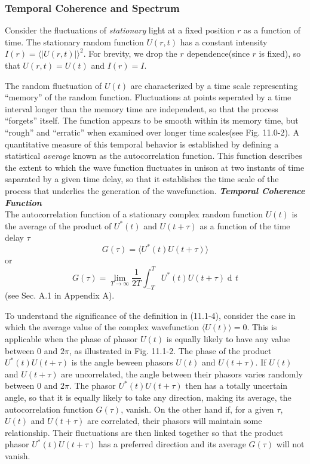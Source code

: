 \documentclass{article}
\numberwithin{figure}{subsection}
\numberwithin{table}{subsection}
\DeclareMathOperator\dif{d\!}
\begin{document}
\subsubsection{Temporal Coherence and Spectrum}
\endgroup
Consider the fluctuations of \textsl{stationary} light at a fixed position $ r $ as a function of time. The stationary random function $ U(r,t) $ has a constant intensity $ I(r) = \langle \lvert U(r,t) \rvert \rangle ^2 $. For brevity, we drop the $ r $ dependence(since $ r $ is fixed), so that $ U(r,t) = U(t) $ and $ I(r)=I $.
\par The random fluctuation of $ U(t) $ are characterized by a time scale representing ``memory'' of the random function. Fluctuations at points seperated by a time interval longer than the memory time are independent, so that the process ``forgets'' itself. The function appears to be smooth within its memory time, but ``rough'' and ``erratic''  when examined over longer time scales(see Fig. 11.0-2). A quantitative measure of this temporal behavior is established by defining a statistical \textsl{average} known as the autocorrelation function. This function describes the extent to which the wave function fluctuates in unison at two instants of time saparated by a given time delay, so that it establishes the time scale  of the process that underlies the generation of the wavefunction.
\bigbreak\noindent\textcolor{ksc}{\textbf{\textsl{Temporal Coherence Function}}}\\
The autocorrelation function of a stationary complex random function $ U(t)  $ is the average of the product of $ U^\ast (t) $ and $ U(t+\tau) $ as a function of the time delay $ \tau $ 
\begin{equation}
G(\tau) = \langle U^\ast (t)U(t+\tau) \rangle
\end{equation}
or
\begin{equation}
G(\tau) = \lim_{T\to\infty}\frac{1}{2T} \int_{-T}^T U^\ast (t)U(t+\tau) \dif t
\end{equation}
(see Sec. A.1 in Appendix A).
\par To understand the significance of the definition in (11.1-4), consider the case in which the average value of the complex wavefunction $\langle U(t) \rangle = 0 $. This is applicable when the phase of phasor $U(t)$ is equally likely to have any value between 0 and $ 2\pi $, as illustrated in Fig. 11.1-2. The phase of the product $ U^\ast (t)U(t+\tau) $ is the angle beween phasors $ U(t) $ and $ U(t+\tau) $. If $ U(t) $ and $ U(t+\tau) $ are uncorrelated, the angle between their phasors varies randomly between 0 and $ 2\pi $. The phasor $ U^\ast (t)U(t+\tau) $ then has a totally uncertain angle, so that it is equally likely to take any direction, making its average, the autocorrelation function $ G(\tau) $, vanish. On the other hand if, for a given $ \tau$, $ U(t) $ and $ U(t+\tau) $ are correlated, their phasors will maintain some relationship. Their fluctuations are then linked together so that the product phasor $ U^\ast (t)U(t+\tau) $ has a preferred direction and its average $ G(\tau) $ will not vanish.
\end{document}
